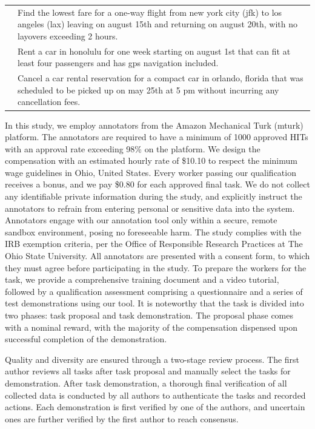 \begin{table}[]
\begin{tabular}{lp{10cm}}
            &Find the lowest fare for a one-way flight from new york city (jfk) to los angeles (lax) leaving on august 15th and returning on august 20th, with no layovers exceeding 2 hours.\\\addlinespace
            &Rent a car in honolulu for one week starting on august 1st that can fit at least four passengers and has gps navigation included.\\\addlinespace
            &Cancel a car rental reservation for a compact car in orlando, florida that was scheduled to be picked up on may 25th at 5 pm without incurring any cancellation fees.\\
         \bottomrule
    \end{tabular}
    \label{tab:task_generation_prompt}
\end{table}

In this study, we employ annotators from the Amazon Mechanical Turk (mturk) platform. The annotators are required to have a minimum of \num{1000} approved HITs with an approval rate exceeding \num{98}\% on the platform.
We design the compensation with an estimated hourly rate of \$10.10 to respect the minimum wage guidelines in Ohio, United States.
Every worker passing our qualification receives a bonus, and we pay \$\num{0.80} for each approved final task.
We do not collect any identifiable private information during the study, and explicitly instruct the annotators to refrain from entering personal or sensitive data into the system. Annotators engage with our annotation tool only within a secure, remote sandbox environment, posing no foreseeable harm.
The study complies with the IRB exemption criteria, per the Office of Responsible Research Practices at The Ohio State University. All annotators are presented with a consent form, to which they must agree before participating in the study.
To prepare the workers for the task, we provide a comprehensive training document and a video tutorial, followed by a qualification assessment comprising a questionnaire and a series of test demonstrations using our tool.
It is noteworthy that the task is divided into two phases: task proposal and task demonstration. The proposal phase comes with a nominal reward, with the majority of the compensation dispensed upon successful completion of the demonstration.

Quality and diversity are ensured through a two-stage review process.
The first author reviews all tasks after task proposal and manually select the tasks for demonstration.
After task demonstration, a thorough final verification of all collected data is conducted by all authors to authenticate the tasks and recorded actions.
Each demonstration is first verified by one of the authors, and uncertain ones are further verified by the first author to reach consensus.

